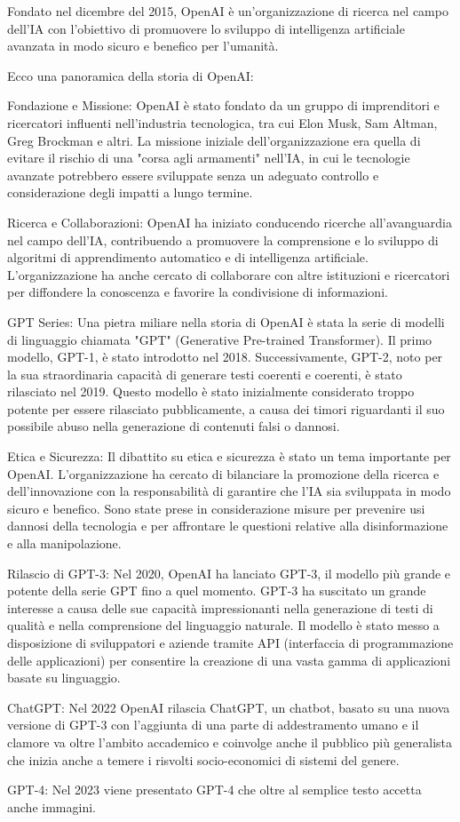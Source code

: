 Fondato nel dicembre del 2015, OpenAI è un'organizzazione di ricerca nel campo dell'IA con l'obiettivo di promuovere lo sviluppo di intelligenza artificiale avanzata in modo sicuro e benefico per l'umanità.

Ecco una panoramica della storia di OpenAI:

Fondazione e Missione: OpenAI è stato fondato da un gruppo di imprenditori e ricercatori influenti nell'industria tecnologica, tra cui Elon Musk, Sam Altman, Greg Brockman e altri. La missione iniziale dell'organizzazione era quella di evitare il rischio di una "corsa agli armamenti" nell'IA, in cui le tecnologie avanzate potrebbero essere sviluppate senza un adeguato controllo e considerazione degli impatti a lungo termine.

Ricerca e Collaborazioni: OpenAI ha iniziato conducendo ricerche all'avanguardia nel campo dell'IA, contribuendo a promuovere la comprensione e lo sviluppo di algoritmi di apprendimento automatico e di intelligenza artificiale. L'organizzazione ha anche cercato di collaborare con altre istituzioni e ricercatori per diffondere la conoscenza e favorire la condivisione di informazioni.

GPT Series: Una pietra miliare nella storia di OpenAI è stata la serie di modelli di linguaggio chiamata "GPT" (Generative Pre-trained Transformer). Il primo modello, GPT-1, è stato introdotto nel 2018. Successivamente, GPT-2, noto per la sua straordinaria capacità di generare testi coerenti e coerenti, è stato rilasciato nel 2019. Questo modello è stato inizialmente considerato troppo potente per essere rilasciato pubblicamente, a causa dei timori riguardanti il suo possibile abuso nella generazione di contenuti falsi o dannosi.

Etica e Sicurezza: Il dibattito su etica e sicurezza è stato un tema importante per OpenAI. L'organizzazione ha cercato di bilanciare la promozione della ricerca e dell'innovazione con la responsabilità di garantire che l'IA sia sviluppata in modo sicuro e benefico. Sono state prese in considerazione misure per prevenire usi dannosi della tecnologia e per affrontare le questioni relative alla disinformazione e alla manipolazione.

Rilascio di GPT-3: Nel 2020, OpenAI ha lanciato GPT-3, il modello più grande e potente della serie GPT fino a quel momento. GPT-3 ha suscitato un grande interesse a causa delle sue capacità impressionanti nella generazione di testi di qualità e nella comprensione del linguaggio naturale. Il modello è stato messo a disposizione di sviluppatori e aziende tramite API (interfaccia di programmazione delle applicazioni) per consentire la creazione di una vasta gamma di applicazioni basate su linguaggio.

ChatGPT: Nel 2022 OpenAI rilascia ChatGPT, un chatbot, basato su una nuova versione di GPT-3 con l'aggiunta di una parte di addestramento umano e il clamore va oltre l'ambito accademico e coinvolge anche il pubblico più generalista che inizia anche a temere i risvolti socio-economici di sistemi del genere.

GPT-4: Nel 2023 viene presentato GPT-4 che oltre al semplice testo accetta anche immagini. 